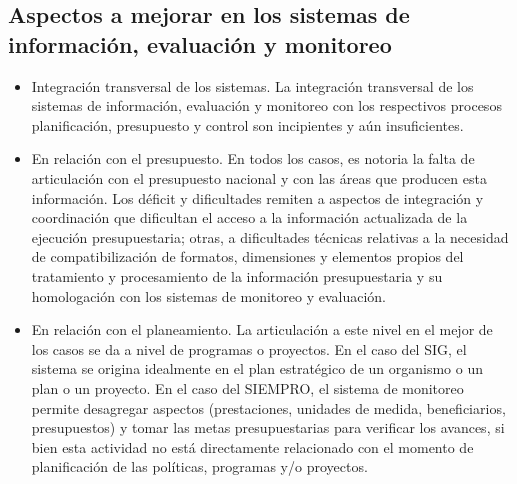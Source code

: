 \subsection{Aspectos a mejorar en los sistemas de información, evaluación y monitoreo}

    \begin{itemize}
        \item Integración transversal de los sistemas. La integración transversal de los sistemas de información, evaluación y monitoreo con los respectivos procesos planificación, presupuesto y control son incipientes y aún insuficientes.
        \item En relación con el presupuesto. En todos los casos, es notoria la falta de articulación con el presupuesto nacional y con las áreas que producen esta información.  Los déficit y dificultades remiten a aspectos de integración y coordinación que dificultan el acceso a la información actualizada de la ejecución presupuestaria; otras, a dificultades técnicas relativas a la necesidad de compatibilización de formatos, dimensiones y elementos propios del tratamiento y procesamiento de la información presupuestaria y su homologación con los sistemas de monitoreo y evaluación. 
        \item En relación con el planeamiento. La articulación a este nivel en el mejor de los casos se da a nivel de programas o proyectos. En el caso del SIG, el sistema se origina idealmente en el plan estratégico de un organismo o un plan o un proyecto. En el caso del SIEMPRO, el sistema de monitoreo permite desagregar aspectos (prestaciones, unidades de medida, beneficiarios, presupuestos) y tomar las metas presupuestarias para verificar los avances, si bien esta actividad  no está directamente relacionado con el momento de planificación de las políticas, programas  y/o proyectos.
    \end{itemize}

